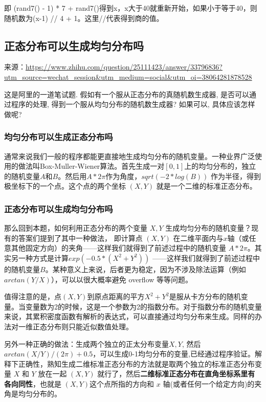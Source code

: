 \documentclass[12pt]{article}
\begin{document}
即 (rand7() - 1) * 7 + rand7()得到x，x大于40就重新开始，如果小于等于40，则随机数为(x-1) // 4 + 1。这里//代表得到商的值。

\subsection{正态分布可以生成均匀分布吗}
来源：\url{https://www.zhihu.com/question/25111423/answer/33796836?utm_source=wechat_session&utm_medium=social&utm_oi=38064281878528}

这是阿里的一道笔试题. 假如有一个服从正态分布的真随机数生成器, 是否可以通过程序的处理, 得到一个服从均匀分布的随机数生成器? 如果可以, 具体应该怎样做呢? 

\subsubsection{均匀分布可以生成正态分布吗}
通常来说我们一般的程序都能更直接地生成均匀分布的随机变量。一种业界广泛使用的做法叫Box-Muller-Wiener算法。首先生成一对$[0,1]$上的均匀分布的，独立的随机变量$A$和$B$。然后用$A *2\pi $作为角度，$sqrt(-2*log(B))$ 作为半径，得到极坐标下的一个点。这个点的两个坐标 $(X,Y)$ 就是一个二维的标准正态分布。

\subsubsection{正态分布可以生成均匀分布吗}
那么回到本题，如何利用正态分布的两个变量 $X,Y$ 生成均匀分布的随机变量？现有的答案们提到了其中一种做法， 即计算点 $(X,Y)$ 在二维平面内与$x$轴（或任意其他固定方向）的夹角——这样我们就得到了前述过程中的随机变量 $A * 2\pi$。其实另一种方式是计算$exp( -0.5 * (X^2 + Y^2))$ ——这样我们就得到了前述过程中的随机变量$B$。某种意义上来说，后者更为稳定，因为不涉及除法运算（例如$arctan(Y/X)$），可以以很大概率避免 overflow 等等问题。

值得注意的是，点$(X,Y)$到原点距离的平方$X^2 + Y^2$是服从卡方分布的随机变量。当变量数为2的时候，这是一个参数为2的指数分布。对于指数分布的随机变量来说，其累积密度函数有解析的表达式，可以直接通过均匀分布来生成。同样的办法对一维正态分布则只能近似数值处理。

另外一种正确的做法：生成两个独立的正太分布变量$X,Y$, 然后$arctan(X/Y)/(2\pi)+0.5$，可以生成0-1均匀分布的变量,已经通过程序验证。解释下正确性，熟知生成二维标准正态分布的方法就是取两个独立的标准正态分布变量 $X$ 和 $Y$ 放在一起 $(X, Y)$ 就行了，然后\textbf{二维标准正态分布在直角坐标系里有各向同性}，也就是 $(X, Y)$这个点所指的方向和 $x$ 轴(或者任何一个给定方向)的夹角是均匀分布的。
\end{document}
